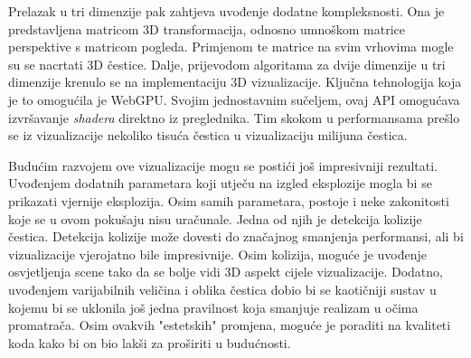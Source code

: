 \documentclass{foi}
\begin{document}
Prelazak u tri dimenzije pak zahtjeva uvođenje dodatne kompleksnosti. Ona je predstavljena matricom 3D transformacija, odnosno umnoškom matrice perspektive s matricom pogleda. Primjenom te matrice na svim vrhovima mogle su se nacrtati 3D čestice. Dalje, prijevodom algoritama za dvije dimenzije u tri dimenzije krenulo se na implementaciju 3D vizualizacije. Ključna tehnologija koja je to omogućila je WebGPU. Svojim jednostavnim sučeljem, ovaj API omogućava izvršavanje \textit{shadera} direktno iz preglednika. Tim skokom u performansama prešlo se iz vizualizacije nekoliko tisuća čestica u vizualizaciju milijuna čestica.

Budućim razvojem ove vizualizacije mogu se postići još impresivniji rezultati. Uvođenjem dodatnih parametara koji utječu na izgled eksplozije mogla bi se prikazati vjernije eksplozija. Osim samih parametara, postoje i neke zakonitosti koje se u ovom pokušaju nisu uračunale. Jedna od njih je detekcija kolizije čestica. Detekcija kolizije može dovesti do značajnog smanjenja performansi, ali bi vizualizacije vjerojatno bile impresivnije. Osim kolizija, moguće je uvođenje osvjetljenja scene tako da se bolje vidi 3D aspekt cijele vizualizacije. Dodatno, uvođenjem varijabilnih veličina i oblika čestica dobio bi se kaotičniji sustav u kojemu bi se uklonila još jedna pravilnost koja smanjuje realizam u očima promatrača. Osim ovakvih "estetskih" promjena, moguće je poraditi na kvaliteti koda kako bi on bio lakši za proširiti u budućnosti.

\printbibliography[title=Popis literature]

\listoffigures
{}

\appendix
\renewcommand{\thechapter}{\arabic{chapter}}
\end{document}
